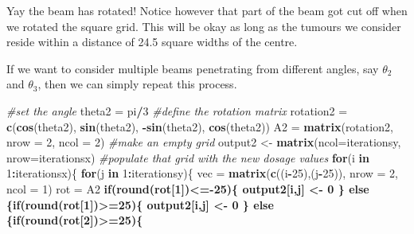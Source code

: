 \documentclass[]{article}
\newenvironment{Shaded}{\begin{snugshade}}{\end{snugshade}}
\newcommand{\KeywordTok}[1]{\textcolor[rgb]{0.13,0.29,0.53}{\textbf{#1}}}
\newcommand{\DataTypeTok}[1]{\textcolor[rgb]{0.13,0.29,0.53}{#1}}
\newcommand{\DecValTok}[1]{\textcolor[rgb]{0.00,0.00,0.81}{#1}}
\newcommand{\StringTok}[1]{\textcolor[rgb]{0.31,0.60,0.02}{#1}}
\newcommand{\CommentTok}[1]{\textcolor[rgb]{0.56,0.35,0.01}{\textit{#1}}}
\newcommand{\ControlFlowTok}[1]{\textcolor[rgb]{0.13,0.29,0.53}{\textbf{#1}}}
\newcommand{\OperatorTok}[1]{\textcolor[rgb]{0.81,0.36,0.00}{\textbf{#1}}}
\newcommand{\NormalTok}[1]{#1}
\begin{document}
Yay the beam has rotated! Notice however that part of the beam got cut
off when we rotated the square grid. This will be okay as long as the
tumours we consider reside within a distance of 24.5 square widths of
the centre.

If we want to consider multiple beams penetrating from different angles,
say \(\theta_2\) and \(\theta_3\), then we can simply repeat this
process.

\begin{Shaded}
\begin{Highlighting}[]
\CommentTok{#set the angle}
\NormalTok{theta2 =}\StringTok{ }\NormalTok{pi}\OperatorTok{/}\DecValTok{3}
\CommentTok{#define the rotation matrix}
\NormalTok{rotation2 =}\StringTok{ }\KeywordTok{c}\NormalTok{(}\KeywordTok{cos}\NormalTok{(theta2), }\KeywordTok{sin}\NormalTok{(theta2), }\OperatorTok{-}\KeywordTok{sin}\NormalTok{(theta2), }\KeywordTok{cos}\NormalTok{(theta2))}
\NormalTok{A2 =}\StringTok{ }\KeywordTok{matrix}\NormalTok{(rotation2, }\DataTypeTok{nrow =} \DecValTok{2}\NormalTok{, }\DataTypeTok{ncol =} \DecValTok{2}\NormalTok{)}
\CommentTok{#make an empty grid }
\NormalTok{output2 <-}\StringTok{ }\KeywordTok{matrix}\NormalTok{(}\DataTypeTok{ncol=}\NormalTok{iterationsy, }\DataTypeTok{nrow=}\NormalTok{iterationsx)}
\CommentTok{#populate that grid with the new dosage values}
\ControlFlowTok{for}\NormalTok{(i }\ControlFlowTok{in} \DecValTok{1}\OperatorTok{:}\NormalTok{iterationsx)\{}
  \ControlFlowTok{for}\NormalTok{(j }\ControlFlowTok{in} \DecValTok{1}\OperatorTok{:}\NormalTok{iterationsy)\{}
\NormalTok{    vec =}\StringTok{ }\KeywordTok{matrix}\NormalTok{(}\KeywordTok{c}\NormalTok{((i}\OperatorTok{-}\DecValTok{25}\NormalTok{),(j}\OperatorTok{-}\DecValTok{25}\NormalTok{)), }\DataTypeTok{nrow =} \DecValTok{2}\NormalTok{, }\DataTypeTok{ncol =} \DecValTok{1}\NormalTok{)}
\NormalTok{    rot =}\StringTok{ }\NormalTok{A2 }\OperatorTok{%
    \ControlFlowTok{if}\NormalTok{(}\KeywordTok{round}\NormalTok{(rot[}\DecValTok{1}\NormalTok{])}\OperatorTok{<=-}\DecValTok{25}\NormalTok{)\{}
\NormalTok{      output2[i,j] <-}\StringTok{ }\DecValTok{0}
\NormalTok{    \} }\ControlFlowTok{else}\NormalTok{ \{}\ControlFlowTok{if}\NormalTok{(}\KeywordTok{round}\NormalTok{(rot[}\DecValTok{1}\NormalTok{])}\OperatorTok{>=}\DecValTok{25}\NormalTok{)\{}
\NormalTok{      output2[i,j] <-}\StringTok{ }\DecValTok{0}
\NormalTok{    \} }\ControlFlowTok{else}\NormalTok{ \{}\ControlFlowTok{if}\NormalTok{(}\KeywordTok{round}\NormalTok{(rot[}\DecValTok{2}\NormalTok{])}\OperatorTok{>=}\DecValTok{25}\NormalTok{)\{}
}
\end{Highlighting}
\end{Shaded}
\end{document}

